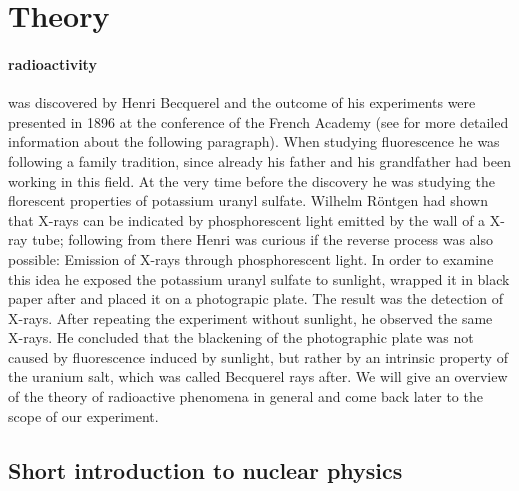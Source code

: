 \section{Theory}
\label{sec:theory}
\paragraph{radioactivity} was discovered by Henri Becquerel and the outcome of his experiments
were presented in 1896 at the conference of the French Academy (see \cite{konya2012nuclear} for 
more detailed information about the following paragraph). 
When studying 
fluorescence he was following a family tradition, since already his father and his grandfather had been
working in this field. At the very time before the discovery he was studying the florescent properties
of potassium uranyl sulfate. Wilhelm Röntgen had shown that X-rays can be indicated by phosphorescent light
emitted by the wall of a X-ray tube; following from there Henri was curious if the reverse process was also
possible: Emission of X-rays through phosphorescent light. In order to examine this idea he exposed
the potassium uranyl sulfate to sunlight, wrapped it in black paper after and placed it on a photograpic plate.
The result was the detection of X-rays. After repeating the experiment without sunlight, he observed the 
same X-rays. He concluded that the blackening of the photographic plate was not caused by fluorescence
induced by sunlight, but rather by an intrinsic property of the uranium salt, which was called Becquerel rays
after. We will give an overview of the theory of radioactive phenomena in general and come back later
to the scope of our experiment.
\subsection{Short introduction to nuclear physics}
